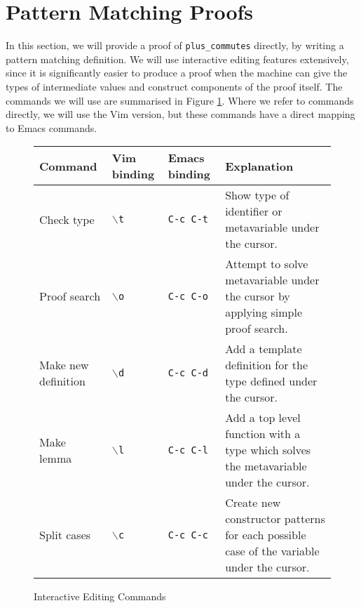 \section{Pattern Matching Proofs}

In this section, we will provide a proof of \texttt{plus\_commutes} directly,
by writing a pattern matching definition. We will use interactive editing
features extensively, since it is significantly easier to produce a proof
when the machine can give the types of intermediate values and construct
components of the proof itself. The commands we will use are summarised
in Figure \ref{commands}. Where we refer to commands directly, we will
use the Vim version, but these commands have a direct mapping to Emacs commands.

\newcommand{\mkdef}{\texttt{$\backslash$d}}
\newcommand{\mklem}{\texttt{$\backslash$l}}
\newcommand{\ctype}{\texttt{$\backslash$t}}
\newcommand{\csplit}{\texttt{$\backslash$c}}
\newcommand{\psearch}{\texttt{$\backslash$o}}

\begin{figure}
\begin{tabularx}{\linewidth}{lllX}
\toprule
Command & Vim binding & Emacs binding & Explanation \\
\midrule

Check type & \texttt{$\backslash$t} & \texttt{C-c C-t} &
Show type of identifier or metavariable under the cursor.\\

Proof search & \texttt{$\backslash$o} & \texttt{C-c C-o} &
Attempt to solve metavariable under the cursor by applying simple proof
search.\\

Make new definition & \texttt{$\backslash$d} & \texttt{C-c C-d} &
Add a template definition for the type defined under the cursor.\\

Make lemma & \texttt{$\backslash$l} & \texttt{C-c C-l} &
Add a top level function with a type which solves the metavariable under the
cursor.\\

Split cases & \texttt{$\backslash$c} & \texttt{C-c C-c} &
Create new constructor patterns for each possible case of the variable under
the cursor.\\
\bottomrule
\end{tabularx}
\caption{Interactive Editing Commands}
\label{commands}
\end{figure}

